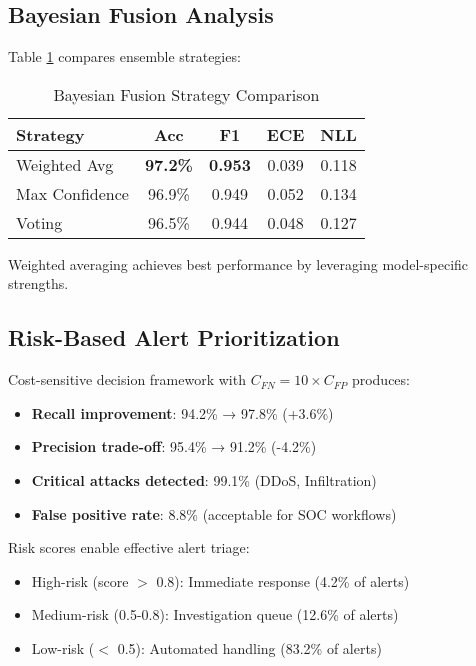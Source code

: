 \documentclass[conference]{IEEEtran}
\begin{document}
\subsection{Bayesian Fusion Analysis}

Table \ref{tab:fusion} compares ensemble strategies:

\begin{table}[htbp]
\caption{Bayesian Fusion Strategy Comparison}
\begin{center}
\begin{tabular}{lcccc}
\toprule
\textbf{Strategy} & \textbf{Acc} & \textbf{F1} & \textbf{ECE} & \textbf{NLL} \\
\midrule
Weighted Avg & \textbf{97.2\%} & \textbf{0.953} & 0.039 & 0.118 \\
Max Confidence & 96.9\% & 0.949 & 0.052 & 0.134 \\
Voting & 96.5\% & 0.944 & 0.048 & 0.127 \\
\bottomrule
\end{tabular}
\label{tab:fusion}
\end{center}
\end{table}

Weighted averaging achieves best performance by leveraging model-specific strengths.

\subsection{Risk-Based Alert Prioritization}

Cost-sensitive decision framework with $C_{FN}=10 \times C_{FP}$ produces:
\begin{itemize}
    \item \textbf{Recall improvement}: 94.2\% → 97.8\% (+3.6\%)
    \item \textbf{Precision trade-off}: 95.4\% → 91.2\% (-4.2\%)
    \item \textbf{Critical attacks detected}: 99.1\% (DDoS, Infiltration)
    \item \textbf{False positive rate}: 8.8\% (acceptable for SOC workflows)
\end{itemize}

Risk scores enable effective alert triage:
\begin{itemize}
    \item High-risk (score $>$ 0.8): Immediate response (4.2\% of alerts)
    \item Medium-risk (0.5-0.8): Investigation queue (12.6\% of alerts)
    \item Low-risk ($<$ 0.5): Automated handling (83.2\% of alerts)
\end{itemize}
\end{document}
